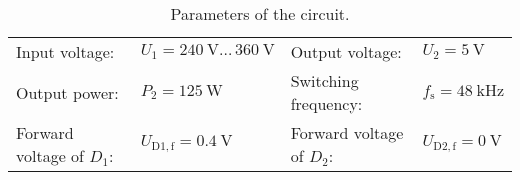 
\begin{table}[htb]
    \centering  %
    \begin{tabular}{llll}
        \toprule
        Input voltage: &  $U_{\mathrm{1}} = \SI{240}{\volt} \ldots \, \SI{360}{\volt}$ & Output voltage: & $U_{\mathrm{2}} = \SI{5}{\volt}$ \\ 
        Output power: & $P_{\mathrm{2}} = \SI{125}{\watt}$ & Switching frequency: & $f_{\mathrm{s}} = \SI{48}{\kilo\hertz}$ \\
        Forward voltage of $D_{\mathrm{1}}$: & $U_{\mathrm{D1,f}} = \SI{0.4}{\volt}$ & Forward voltage of $D_{\mathrm{2}}$: & $U_{\mathrm{D2,f}} = \SI{0}{\volt}$  \\
        \bottomrule
    \end{tabular}
    \caption{Parameters of the circuit.}  %
    \label{table:Ex04_Parameters of the singled ended forward converter.}
\end{table}
